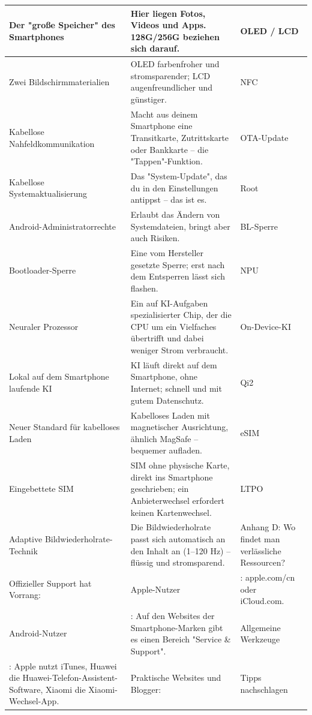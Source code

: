 
\begin{center}
\begin{tabularx}{\linewidth}{|X|X|X|}
\hline
\textbf{Der "große Speicher" des Smartphones} & \textbf{Hier liegen Fotos, Videos und Apps. 128G/256G beziehen sich darauf.} & \textbf{OLED / LCD} \tabularnewline
\hline
Zwei Bildschirmmaterialien & OLED farbenfroher und stromsparender; LCD augenfreundlicher und günstiger. & NFC \tabularnewline
Kabellose Nahfeldkommunikation & Macht aus deinem Smartphone eine Transitkarte, Zutrittskarte oder Bankkarte – die "Tappen"-Funktion. & OTA-Update \tabularnewline
Kabellose Systemaktualisierung & Das "System-Update", das du in den Einstellungen antippst – das ist es. & Root \tabularnewline
Android-Administratorrechte & Erlaubt das Ändern von Systemdateien, bringt aber auch Risiken. & BL-Sperre \tabularnewline
Bootloader-Sperre & Eine vom Hersteller gesetzte Sperre; erst nach dem Entsperren lässt sich flashen. & NPU \tabularnewline
Neuraler Prozessor & Ein auf KI-Aufgaben spezialisierter Chip, der die CPU um ein Vielfaches übertrifft und dabei weniger Strom verbraucht. & On-Device-KI \tabularnewline
Lokal auf dem Smartphone laufende KI & KI läuft direkt auf dem Smartphone, ohne Internet; schnell und mit gutem Datenschutz. & Qi2 \tabularnewline
Neuer Standard für kabelloses Laden & Kabelloses Laden mit magnetischer Ausrichtung, ähnlich MagSafe – bequemer aufladen. & eSIM \tabularnewline
Eingebettete SIM & SIM ohne physische Karte, direkt ins Smartphone geschrieben; ein Anbieterwechsel erfordert keinen Kartenwechsel. & LTPO \tabularnewline
Adaptive Bildwiederholrate-Technik & Die Bildwiederholrate passt sich automatisch an den Inhalt an (1–120 Hz) – flüssig und stromsparend. & Anhang D: Wo findet man verlässliche Ressourcen? \tabularnewline
Offizieller Support hat Vorrang: & Apple-Nutzer & : apple.com/cn oder iCloud.com. \tabularnewline
Android-Nutzer & : Auf den Websites der Smartphone-Marken gibt es einen Bereich "Service \& Support". & Allgemeine Werkzeuge \tabularnewline
: Apple nutzt iTunes, Huawei die Huawei-Telefon-Assistent-Software, Xiaomi die Xiaomi-Wechsel-App. & Praktische Websites und Blogger: & Tipps nachschlagen \tabularnewline
\hline
\end{tabularx}
\end{center}

